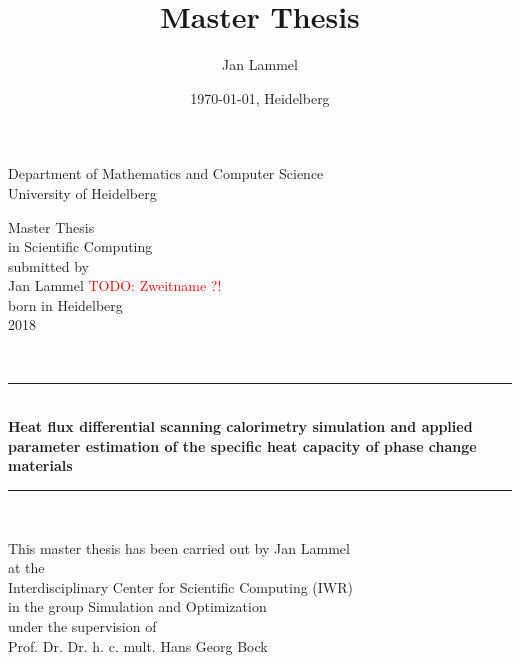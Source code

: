\documentclass{scrartcl}[12pt, halfparskip]
\title{Master Thesis}
\author{Jan Lammel}
\date{\today{}, Heidelberg}
\numberwithin{equation}{section}
\numberwithin{figure}{section}
\numberwithin{table}{section}
\newcommand{\todo}[1]{\textcolor{red}{TODO: #1}}
\begin{document}


\begin{titlepage}
	\begin{center}
		
	\Large{Department of Mathematics and Computer Science} \\[3ex]
	
	University of Heidelberg \\
	
	\vspace{13cm}
	
	Master Thesis \\[0.5ex]
	in Scientific Computing \\[2ex]
	submitted by \\[2ex]
	Jan Lammel \todo{Zweitname ?!} \\[0.5ex]
	born in Heidelberg \\[3ex]
	2018 \\[2ex]
		
	\end{center}
\end{titlepage}


\newpage 

\begin{titlepage}
	\mbox{}\\
\end{titlepage}

\begin{titlepage}
	\begin{center}
		\newcommand{\HRule}{\rule{\linewidth}{0.5mm}}
		\HRule \\[0.1cm]
		{\huge \bfseries Heat flux differential scanning calorimetry simulation and applied parameter estimation of the specific heat capacity of phase change materials}
		\HRule \\[0.3cm]
		
		\vspace{10cm}
		
		{\Large This master thesis has been carried out by Jan Lammel \\[2ex]
		at the \\[2ex]
		Interdisciplinary Center for Scientific Computing (IWR)\\ 
		in the group Simulation and Optimization \\[3ex]
		under the supervision of \\[3ex]
		Prof. Dr. Dr. h. c. mult. Hans Georg Bock}
	\end{center}
\end{titlepage}
\end{document}

